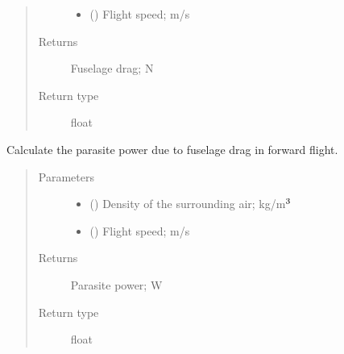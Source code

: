 \documentclass[letterpaper,10pt,english]{sphinxmanual}
\begin{document}
\begin{fulllineitems}
\begin{fulllineitems}
\begin{quote}
\begin{description}
\begin{itemize}
\item {} 
\sphinxAtStartPar
{} () \textendash{} Flight speed; m/s

\end{itemize}

\item[{Returns}] \leavevmode
\sphinxAtStartPar
Fuselage drag; N

\item[{Return type}] \leavevmode
\sphinxAtStartPar
float

\end{description}\end{quote}

\end{fulllineitems}


\begin{fulllineitems}
\label{\detokenize{modules/fuselage:fuselage.Fuselage.get_parasite_power}}
\sphinxAtStartPar
Calculate the parasite power due to fuselage drag in forward flight.
\begin{quote}\begin{description}
\item[{Parameters}] \leavevmode\begin{itemize}
\item {} 
\sphinxAtStartPar
{} () \textendash{} Density of the surrounding air; kg/m\(\sp{\text{3}}\)

\item {} 
\sphinxAtStartPar
{} () \textendash{} Flight speed; m/s

\end{itemize}

\item[{Returns}] \leavevmode
\sphinxAtStartPar
Parasite power; W

\item[{Return type}] \leavevmode
\sphinxAtStartPar
float

\end{description}\end{quote}

\end{fulllineitems}


\end{fulllineitems}
\end{document}
